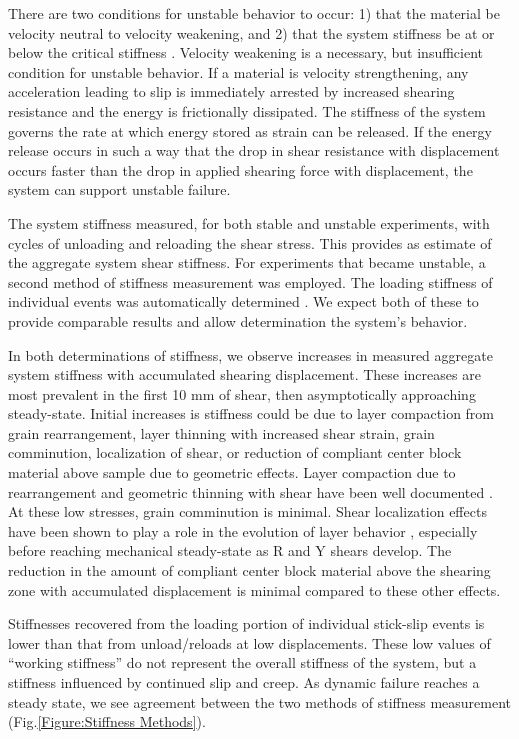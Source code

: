 \documentclass[11pt]{article}
\begin{document}
There are two conditions for unstable behavior to occur: 1) that the material be
velocity neutral to velocity weakening, and 2) that the system stiffness be at
or below the critical stiffness \cite{Marone:1998, Scholz:2002}. Velocity
weakening is a necessary, but insufficient condition for unstable behavior. If a
material is velocity strengthening, any acceleration leading to slip is
immediately arrested by increased shearing resistance and the energy is
frictionally dissipated. The stiffness of the system governs the rate at which
energy stored as strain can be released. If the energy release occurs in such a
way that the drop in shear resistance with displacement occurs faster than the
drop in applied shearing force with displacement, the system can support
unstable failure.

The system stiffness measured, for both stable and unstable experiments, with
cycles of unloading and reloading the shear stress.  This provides as estimate
of the aggregate system shear stiffness. For experiments that became unstable,
a second method of stiffness measurement was employed. The loading stiffness of
individual events was automatically determined \cite{Leeman:2015}. We expect both
of these to provide comparable results and allow determination the system's behavior.

In both determinations of stiffness, we observe increases in measured aggregate
system stiffness with accumulated shearing displacement. These increases are most
prevalent in the first 10 mm of shear, then asymptotically approaching steady-state.
Initial increases is stiffness could be due to layer compaction from
grain rearrangement, layer thinning with increased shear strain, grain
comminution, localization of shear, or reduction of
compliant center block material above sample due to geometric effects.
Layer compaction due to rearrangement and geometric thinning with shear
have been well documented \cite{Scott:1994}.  At these low stresses, grain
comminution is minimal. Shear localization effects have been shown to play a role in the
evolution of layer behavior \cite{Logan:1992}, especially before reaching mechanical
steady-state as R and Y shears develop. The reduction in the amount of
compliant center block material above the shearing zone with accumulated
displacement is minimal compared to these other effects.

Stiffnesses recovered from the loading portion of individual stick-slip events
is lower than that from unload/reloads at low displacements. These low values
of “working stiffness” do not represent the overall stiffness of the system, but
a stiffness influenced by continued slip and creep. As dynamic failure reaches a
steady state, we see agreement between the two methods of stiffness measurement
(Fig.\ref{Figure:Stiffness Methods}).
\end{document}
